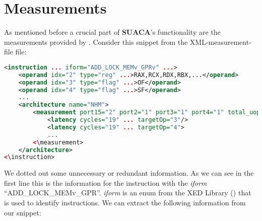 \documentclass[a4paper,12pt,titlepage, twoside]{report}
\newcommand{\suaca}{\textbf{SUACA}}
\begin{document}
\section{Measurements}
\label{sec:measurements}

As mentioned before a crucial part of \suaca's functionality are the measurements provided by \cite{Andreas}. Consider this snippet from the XML-measurement-file file:


\begin{lstlisting}[language=XML, basicstyle=\ttfamily\scriptsize, breaklines=false]
<instruction ... iform="ADD_LOCK_MEMv_GPRv" ...>
    <operand idx="2" type="reg" ...>RAX,RCX,RDX,RBX,...</operand>
    <operand idx="3" type="flag" ...>OF</operand>
    <operand idx="4" type="flag" ...>SF</operand>
    ...
    <architecture name="NHM">
        <measurement port15="2" port2="1" port3="1" port4="1" total_uops="5">
            <latency cycles="19" ... targetOp="3"/>
            <latency cycles="19" ... targetOp="4">
            ...
        <\measurement>
    </architecture>
<\instruction>
\end{lstlisting}

We dotted out some unnecessary or redundant information. As we can see in the first line this is the information for the instruction with the \emph{iform} ``ADD\_LOCK\_MEMv\_GPR''. \emph{iform} is an enum from the XED Library (\cite{xed}) that is used to identify instructions. We can extract the following information from our snippet:
\end{document}
